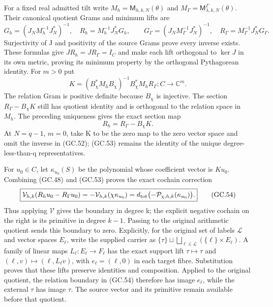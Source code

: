 For a fixed real admitted tilt write $M_h=\mathsf M_{h,k,N}(\theta)$
and $M_\Gamma=\mathsf M_{\lambda,k,N}^\Gamma(\theta)$.
Their canonical quotient Grams and minimum lifts are
\[
 G_h=(J_NM_h^{-1}J_N^*)^{-1},\quad
 R_h=M_h^{-1}J_N^*G_h,
\qquad
 G_\Gamma=(J_NM_\Gamma^{-1}J_N^*)^{-1},\quad
 R_\Gamma=M_\Gamma^{-1}J_N^*G_\Gamma.                           \tag{GC.51}
\]
Surjectivity of J and positivity of the source Grams prove every
inverse exists. These formulas give $JR_h=JR_\Gamma=I_C$ and
make each lift orthogonal to $\ker J$ in its own metric, proving
its minimum property by the orthogonal Pythagorean identity.
For $m>0$ put
\[
 K=(B_\chi^*M_hB_\chi)^{-1}B_\chi^*M_hR_\Gamma:
                         C\longrightarrow\mathbb C^m.
                                                               \tag{GC.52}
\]
The relation Gram is positive definite because $B_\chi$ is
injective. The section $R_\Gamma-B_\chi K$ still has quotient
identity and is orthogonal to the relation space in $M_h$.
The preceding uniqueness gives the exact section map
\[
 \boxed{R_h=R_\Gamma-B_\chi K.}                               \tag{GC.53}
\]
At $N=q-1$, $m=0$, take K to be the zero map to the zero vector
space and omit the inverse in (GC.52); (GC.53) remains the identity
of the unique degree-less-than-q representatives.

For $u_0\in C$, let $\kappa_{u_0}(S)$ be the polynomial whose
coefficient vector is $Ku_0$. Combining (GC.48) and (GC.53) proves
the exact cochain correction
\[
 \boxed{\mathcal V_{h,k}(R_hu_0-R_\Gamma u_0)
  =-\mathcal V_{h,k}(\chi\kappa_{u_0})
  =d_{\rm tot}\bigl(-\mathcal P_{\chi,h,k}(\kappa_{u_0})\bigr).}
                                                               \tag{GC.54}
\]
Thus applying $\mathcal V$ gives the boundary in degree k; the
explicit negative cochain on the right is its primitive in degree
$k-1$. Passing to the original arithmetic quotient sends this
boundary to zero. Explicitly, for the original set of labels
$\mathcal L$ and vector spaces $E_\ell$, write the supplied carrier
as $\{\tau\}\sqcup\bigsqcup_{\ell\in\mathcal L}(\{\ell\}\times E_\ell)$.
A family of linear maps $L_\ell:E_\ell\to F_\ell$ has the exact
support lift $\tau\mapsto\tau$ and
$(\ell,v)\mapsto(\ell,L_\ell v)$, with
$e_\ell=(\ell,0)$ in each target fibre. Substitution proves that
these lifts preserve identities and composition. Applied to the
original quotient, the relation boundary in (GC.54) therefore has
image $e_\ell$, while the external $\tau$ has image $\tau$.
The source vector and its primitive remain available before that
quotient.

